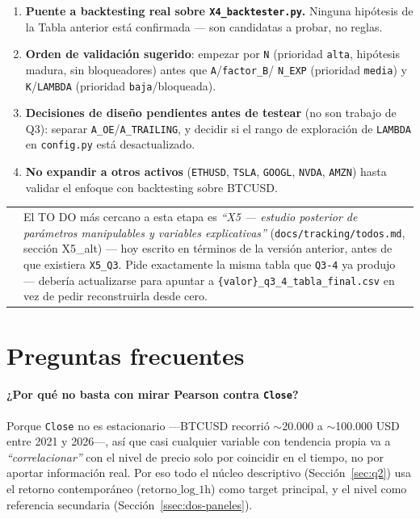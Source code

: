 \documentclass[11pt,a4paper]{article}
\makeatletter
\newcommand{\code}[1]{\texttt{\small #1}}
\newenvironment{nota}{%
  \par\medskip\noindent
  \begin{tabular}{@{}p{0.4em}@{\hspace{8pt}}p{\dimexpr\linewidth-2em\relax}@{}}
  \textcolor{cnaranja}{\rule{3pt}{1.1em}} &
}{\end{tabular}\par\medskip}
\newcommand{\dq}[1]{\emph{``#1''}}
\makeatother
\begin{document}
\begin{enumerate}[leftmargin=1.4em,itemsep=3pt]
\item \textbf{Puente a backtesting real sobre \code{X4\_backtester.py}.} Ninguna hipótesis
  de la Tabla anterior está confirmada — son candidatas a probar, no reglas.
\item \textbf{Orden de validación sugerido}: empezar por \code{N} (prioridad
  \code{alta}, hipótesis madura, sin bloqueadores) antes que \code{A}/\code{factor\_B}/
  \code{N\_EXP} (prioridad \code{media}) y \code{K}/\code{LAMBDA} (prioridad
  \code{baja}/bloqueada).
\item \textbf{Decisiones de diseño pendientes antes de testear} (no son trabajo de Q3):
  separar \code{A\_OE}/\code{A\_TRAILING}, y decidir si el rango de exploración de
  \code{LAMBDA} en \code{config.py} está desactualizado.
\item \textbf{No expandir a otros activos} (\code{ETHUSD}, \code{TSLA}, \code{GOOGL},
  \code{NVDA}, \code{AMZN}) hasta validar el enfoque con backtesting sobre BTCUSD.
\end{enumerate}

\begin{nota}
El TO DO más cercano a esta etapa es \dq{X5 — estudio posterior de parámetros manipulables
y variables explicativas} (\code{docs/tracking/todos.md}, sección X5\_alt) — hoy escrito en
términos de la versión anterior, antes de que existiera \code{X5\_Q3}. Pide exactamente la
misma tabla que \code{Q3-4} ya produjo — debería actualizarse para apuntar a
\code{\{valor\}\_q3\_4\_tabla\_final.csv} en vez de pedir reconstruirla desde cero.
\end{nota}

\newpage
\section{Preguntas frecuentes}
\label{sec:faq}

\paragraph{¿Por qué no basta con mirar Pearson contra \code{Close}?}
Porque \code{Close} no es estacionario —BTCUSD recorrió \(\sim\)20.000 a \(\sim\)100.000
USD entre 2021 y 2026—, así que casi cualquier variable con tendencia propia va a
\dq{correlacionar} con el nivel de precio solo por coincidir en el tiempo, no por aportar
información real. Por eso todo el núcleo descriptivo (Sección~\ref{sec:q2}) usa el retorno
contemporáneo (\(\text{retorno\_log\_1h}\)) como target principal, y el nivel como
referencia secundaria (Sección~\ref{ssec:dos-paneles}).
\end{document}
